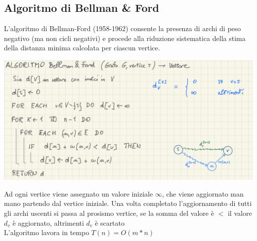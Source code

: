 \documentclass[11pt, oneside]{article}   	%
\begin{document}
\subsection*{Algoritmo di Bellman \& Ford}
L’algoritmo di Bellman-Ford (1958-1962) consente la presenza di archi di peso negativo (ma non cicli negativi) e procede alla riduzione sistematica della stima della distanza minima calcolata per ciascun vertice.
\begin{center}
\includegraphics[scale=0.6]{bellman}
\end{center}
Ad ogni vertice viene assegnato un valore iniziale $\infty$, che viene aggiornato man mano partendo dal vertice iniziale. Una volta completato l'aggiornamento di tutti gli archi uscenti si passa al prosismo vertice, se la somma del valore è $<$ il valore $d_v$ è aggiornato, altrimenti $d_v$ è scartato\\
L'algoritmo lavora in tempo $T(n) = O(m*n)$
\end{document}
